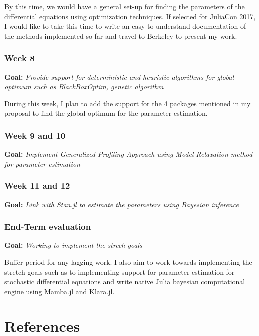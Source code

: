 \documentclass[11pt]{article}
\begin{document}
By this time, we would have a general set-up for finding the parameters
of the differential equations using optimization techniques. If selected
for JuliaCon 2017, I would like to take this time to write an easy to
understand documentation of the methods implemented so far and travel to
Berkeley to present my work.

    \subsubsection{Week 8}\label{week-8}

\textbf{Goal:} \emph{Provide support for deterministic and heuristic
algorithms for global optimum such as BlackBoxOptim, genetic algorithm }

During this week, I plan to add the support for the 4 packages mentioned
in my proposal to find the global optimum for the parameter estimation.

    \subsubsection{Week 9 and 10}\label{week-9-and-10}

\textbf{Goal:} \emph{Implement Generalized Profiling Approach using
Model Relaxation method for parameter estimation}

    \subsubsection{Week 11 and 12}\label{week-11-and-12}

\textbf{Goal:} \emph{Link with Stan.jl to estimate the parameters using
Bayesian inference}

    \subsubsection{End-Term evaluation}\label{end-term-evaluation}

\textbf{Goal:} \emph{Working to implement the strech goals}

Buffer period for any lagging work. I also aim to work towards
implementing the stretch goals such as to implementing support for
parameter estimation for stochastic differential equations and write
native Julia bayesian computational engine using Mamba.jl and Klara.jl.

    \section{References}\label{references}
\end{document}
